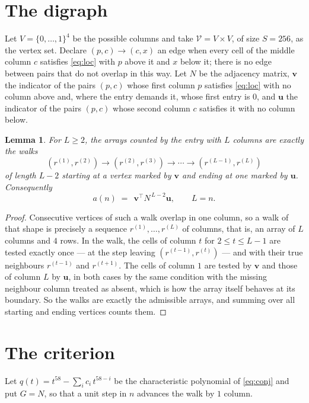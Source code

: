 \documentclass[11pt,a4paper]{article}
\theoremstyle{plain}
\newtheorem{lemma}[theorem]{Lemma}
\theoremstyle{definition}
\begin{document}
\section{The digraph}

Let $V=\{0,\dots,1\}^{4}$ be the possible columns and take
$\mathcal V=V\times V$, of size $S=256$, as the vertex set. Declare $(p,c)\to(c,x)$ an edge
when every cell of the middle column $c$ satisfies \eqref{eq:loc} with $p$ above it and $x$
below it; there is no edge between pairs that do not overlap in this way. Let $N$ be the
adjacency matrix, $\mathbf{v}$ the indicator of the pairs $(p,c)$ whose first column $p$
satisfies \eqref{eq:loc} with no column above and, where the entry demands it, whose first entry is $0$, and $\mathbf{u}$ the indicator of
the pairs $(p,c)$ whose second column $c$ satisfies it with no column below.

\begin{lemma}\label{lem:walk}
For $L\ge2$, the arrays counted by the entry with $L$ columns are exactly the walks
\[
(r^{(1)},r^{(2)})\to(r^{(2)},r^{(3)})\to\cdots\to(r^{(L-1)},r^{(L)})
\]
of length $L-2$ starting at a vertex marked by $\mathbf{v}$ and ending at one marked by
$\mathbf{u}$. Consequently
\[
a(n)\;=\;\,\mathbf{v}^{\!\top}N^{\,L-2}\mathbf{u},\qquad L=n .
\]
\end{lemma}

\begin{proof}
Consecutive vertices of such a walk overlap in one column, so a walk of that shape is
precisely a sequence $r^{(1)},\dots,r^{(L)}$ of columns, that is, an array of $L$ columns
and $4$ rows. In the walk, the cells of column $t$ for $2\le t\le L-1$ are tested
exactly once --- at the step leaving $(r^{(t-1)},r^{(t)})$ --- and with their true
neighbours $r^{(t-1)}$ and $r^{(t+1)}$. The cells of column $1$ are tested by
$\mathbf{v}$ and those of column $L$ by $\mathbf{u}$, in both cases by the same condition
with the missing neighbour column treated as absent, which is how the array itself behaves at
its boundary. So the walks are exactly the admissible arrays, and summing over all starting
and ending vertices counts them.
\end{proof}

\section{The criterion}

Let $q(t)=t^{58}-\sum_i c_i\,t^{58-i}$ be the characteristic polynomial of
\eqref{eq:conj} and put $G=N$, so that a unit step in $n$ advances the walk by
$1$ column.
\end{document}
